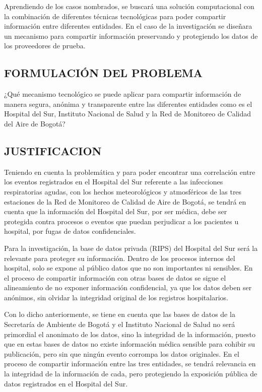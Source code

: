 \documentclass[a4paper, 12pt, oneside]{article}
\theoremstyle{definition}
\theoremstyle{remark}
\begin{document}
Aprendiendo de los casos nombrados, se buscará una solución computacional con la combinación de  diferentes técnicas tecnológicas para poder compartir información entre diferentes entidades. En el caso de la investigación se diseñara un mecanismo para compartir información preservando y protegiendo los datos de los proveedores de prueba. 

\subsection{FORMULACIÓN DEL PROBLEMA}

¿Qué mecanismo tecnológico se puede aplicar para compartir información de manera segura, anónima y transparente entre las diferentes entidades como es el Hospital del Sur, Instituto Nacional de Salud y la Red de Monitoreo de Calidad del Aire de Bogotá?

\subsection{JUSTIFICACION}

Teniendo en cuenta la problemática y para  poder encontrar una correlación entre los eventos registrados en el Hospital del Sur referente a las infecciones respiratorias agudas, con los hechos meteorológicos y atmosféricos de las tres estaciones de la Red de Monitoreo de Calidad de Aire de Bogotá, se tendrá en cuenta que la información del Hospital del Sur, por ser médica, debe ser protegida contra procesos o eventos que puedan perjudicar a los pacientes u hospital, por fugas de datos confidenciales. 

Para la investigación, la base de datos privada (RIPS) del Hospital del Sur será la relevante para proteger su información. Dentro de los procesos internos del hospital, solo se expone al público datos que no son importantes ni sensibles. En el proceso de compartir información con otras bases de datos se sigue el alineamiento de no exponer información confidencial, ya que los datos deben ser anónimos, sin olvidar la integridad original de los registros hospitalarios.

Con lo dicho anteriormente, se tiene en cuenta que las bases de datos de la Secretaría de Ambiente de Bogotá y el Instituto Nacional de Salud no será primordial el anonimato de los datos, sino la integridad de la información, puesto que en estas bases de datos no existe información médica sensible para cohibir su publicación, pero sin que ningún evento corrompa los datos originales. En el proceso de compartir información entre las tres entidades, se tendrá relevancia en la integridad de la información de cada, pero protegiendo la exposición pública de datos registrados en el Hospital del Sur.
\end{document}
